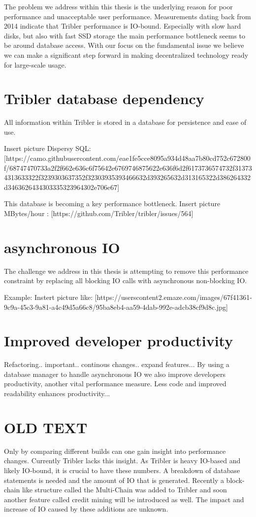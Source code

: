The problem we address within this thesis is the underlying reason for poor performance and unacceptable user performance. Measurements dating back from 2014 indicate that Tribler performance is IO-bound.
Especially with slow hard disks, but also with fast SSD storage the main performance bottleneck seems to be around database access.
With our focus on the fundamental issue we believe we can make a significant step forward in making decentralized technology ready for large-scale usage. 

\section{Tribler database dependency}

All information within Tribler is stored in a database for persistence and ease of use.

Insert picture Dispersy SQL:
[https://camo.githubusercontent.com/eae1fe5cce8095a934d48aa7b80cd752c672800f/68747470733a2f2f662e636c6f75642e6769746875622e636f6d2f6173736574732f313734313633322f3239303637352f32303935393466632d393265632d313165322d386264332d3463626434303335323964302e706e67]

This database is becoming a key performance bottleneck.
Insert picture MBytes/hour : [https://github.com/Tribler/tribler/issues/564]

\section{asynchronous IO}

The challenge we address in this thesis is attempting to remove this performance constraint by replacing all blocking IO calls with asynchronous non-blocking IO. 

Example:
Instert picture like: [https://userscontent2.emaze.com/images/67f41361-9c9a-45c3-9a81-a4c49d5a66c8/95ba8eb4-aa59-4dab-992e-adcb38cf9d8c.jpg]

\section{Improved developer productivity}
Refactoring.. important.. continous changes.. expand features...
By using a database manager to handle asynchronous IO we also improve developers productivity, another vital performance measure. Less code and improved readability enhances productivity...



\section{OLD TEXT}
Only by comparing different builds can one gain insight into performance changes.
Currently Tribler lacks this insight.
As Tribler is heavy IO-based and likely IO-bound, it is crucial to have these numbers.
A breakdown of database statements is needed and the amount of IO that is generated.
Recently a block-chain like structure called the Multi-Chain was added to Tribler and soon another feature called credit mining will be introduced as well.
The impact and increase of IO caused by these additions are unknown.

